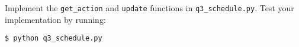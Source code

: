 \item {}

Implement the \texttt{get\_action} and \texttt{update} functions in \texttt{q3\_schedule.py}. Test your implementation by running:
\begin{lstlisting}
$ python q3_schedule.py
\end{lstlisting}
